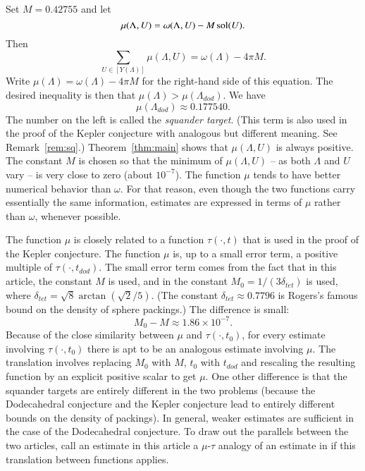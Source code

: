 Set $M=0.42755$ and let
 $$\mu(\Lambda,U)= \omega(\Lambda,U) - M \operatorname{sol}(U).$$
Then
$$
\sum_{U\in[Y(\Lambda)]} \mu(\Lambda,U) = \omega(\Lambda) -  4\pi M.
$$
Write $\mu(\Lambda)= \omega(\Lambda)- 4\pi M$ for the right-hand side of this equation.  The desired inequality is then
that $\mu(\Lambda) > \mu(\Lambda_{dod})$.  
We have 
$$
  \mu(\Lambda_{dod}) \approx 0.177540.
$$
The number on the left is called the {\it squander target}.  (This term
is also used in the proof of the Kepler conjecture with
analogous but different meaning.  See Remark~\ref{rem:sq}.)  
Theorem~\ref{thm:main} shows that $\mu(\Lambda,U)$ is always positive.  The constant
$M$ is chosen so that the minimum of $\mu(\Lambda,U)$ -- as
both $\Lambda$ and $U$  vary -- is very close to zero (about $10^{-7}$).
The function $\mu$ tends to have better numerical behavior
than $\omega$.  For that reason, even though the two
functions carry essentially the same information,
estimates are expressed in terms
of $\mu$ rather than $\omega$, whenever possible.

\begin{remark}\label{rem:sq} The function $\mu$ is closely related to a function
$\tau(\cdot,t)$ that is used in the proof of the Kepler conjecture.  The
function $\mu$ is, up to a small error term, a positive multiple
of $\tau(\cdot,t_{dod})$.   The small
error term comes from the fact that in this article, the constant
$M$ is used, and in \cite{DCG} the constant
$M_0=1/(3 \delta_{tet})$ is used, where $\delta_{tet} = \sqrt8 \arctan(\sqrt2/5)$.  (The constant $\delta_{tet}\approx 0.7796$ is Rogers's famous bound on the density of sphere packings.)  The difference is small:
   $$M_0 - M \approx 1.86 \times 10^{-7}.$$
Because of the close similarity between $\mu$ and $\tau(\cdot,t_0)$,
for every estimate involving $\tau(\cdot,t_0)$ there is apt to
be an analogous estimate involving $\mu$.  The translation involves
replacing $M_0$ with $M$, $t_0$ with $t_{dod}$ and rescaling the
resulting function by an explicit positive scalar to get $\mu$.
One other difference is that the squander targets are entirely different
in the two problems (because the Dodecahedral conjecture and the
Kepler conjecture lead to entirely different bounds on the density
of packings).  In general, weaker estimates are sufficient in the
case of the Dodecahedral conjecture.
To draw out the parallels between the two articles,  call
an estimate in this article a $\mu$-$\tau$ analogy of an estimate
in \cite{DCG} if this translation between functions applies.
\end{remark}



